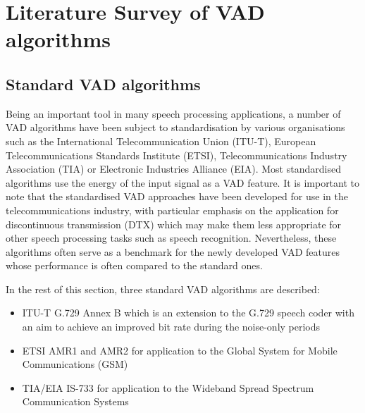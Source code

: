 
\chapter{Literature Survey of VAD algorithms} %

\label{Chapter2} %



\section{Standard VAD algorithms}
\label{sec:StandardVADs}

Being an important tool in many speech processing applications, a number of VAD algorithms have been subject to standardisation by various organisations such as the International Telecommunication Union (ITU-T), European Telecommunications Standards Institute (ETSI), Telecommunications Industry Association (TIA) or Electronic Industries Alliance (EIA). Most standardised algorithms use the energy of the input signal as a VAD feature. It is important to note that the standardised VAD approaches have been developed for use in the telecommunications industry, with particular emphasis on the application for discontinuous transmission (DTX) which may make them less appropriate for other speech processing tasks such as speech recognition. Nevertheless, these algorithms often serve as a benchmark for the newly developed VAD features whose performance is often compared to the standard ones.

In the rest of this section, three standard VAD algorithms are described:
\begin{itemize}
\item ITU-T G.729 Annex B \citep{G729} which is an extension to the G.729 speech coder with an aim to achieve an improved bit rate during the noise-only periods
\item ETSI AMR1 and AMR2 \cite{AMR} for application to the Global System for Mobile Communications (GSM)
\item TIA/EIA IS-733 \cite{IS733} for application to the Wideband Spread Spectrum Communication Systems
\end{itemize}

